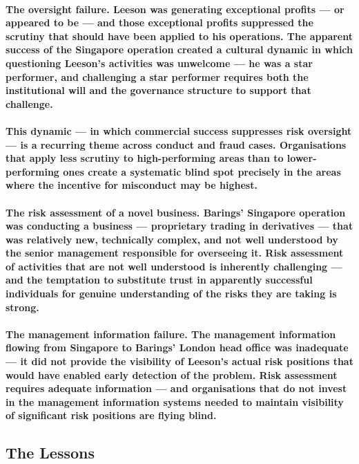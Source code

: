 \paragraph{\textbf{The oversight failure}. Leeson was generating exceptional profits — or appeared to be — and those exceptional profits suppressed the scrutiny that should have been applied to his operations. The apparent success of the Singapore operation created a cultural dynamic in which questioning Leeson's activities was unwelcome — he was a star performer, and challenging a star performer requires both the institutional will and the governance structure to support that challenge.}
\paragraph{This dynamic — in which commercial success suppresses risk oversight — is a recurring theme across conduct and fraud cases. Organisations that apply less scrutiny to high-performing areas than to lower-performing ones create a systematic blind spot precisely in the areas where the incentive for misconduct may be highest.}
\paragraph{\textbf{The risk assessment of a novel business}. Barings' Singapore operation was conducting a business — proprietary trading in derivatives — that was relatively new, technically complex, and not well understood by the senior management responsible for overseeing it. Risk assessment of activities that are not well understood is inherently challenging — and the temptation to substitute trust in apparently successful individuals for genuine understanding of the risks they are taking is strong.}
\paragraph{\textbf{The management information failure}. The management information flowing from Singapore to Barings' London head office was inadequate — it did not provide the visibility of Leeson's actual risk positions that would have enabled early detection of the problem. Risk assessment requires adequate information — and organisations that do not invest in the management information systems needed to maintain visibility of significant risk positions are flying blind.}

\subsection{The Lessons}
